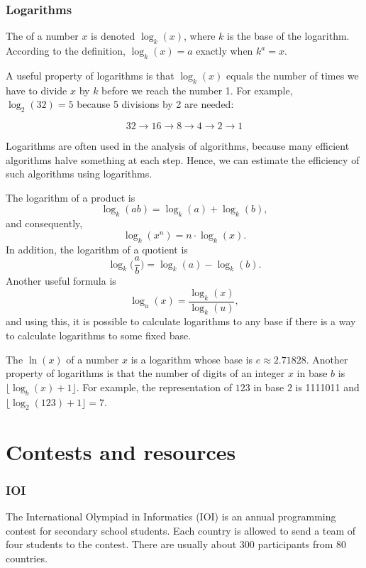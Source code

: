 \subsubsection{Logarithms}


The  of a number $x$
is denoted $\log_k(x)$, where $k$ is the base
of the logarithm.
According to the definition,
$\log_k(x)=a$ exactly when $k^a=x$.

A useful property of logarithms is
that $\log_k(x)$ equals the number of times
we have to divide $x$ by $k$ before we reach 
the number 1.
For example, $\log_2(32)=5$
because 5 divisions by 2 are needed:

\[32 \rightarrow 16 \rightarrow 8 \rightarrow 4 \rightarrow 2 \rightarrow 1 \]

Logarithms are often used in the analysis of
algorithms, because many efficient algorithms
halve something at each step.
Hence, we can estimate the efficiency of such algorithms
using logarithms.

The logarithm of a product is
\[\log_k(ab) = \log_k(a)+\log_k(b),\]
and consequently,
\[\log_k(x^n) = n \cdot \log_k(x).\]
In addition, the logarithm of a quotient is
\[\log_k\Big(\frac{a}{b}\Big) = \log_k(a)-\log_k(b).\]
Another useful formula is
\[\log_u(x) = \frac{\log_k(x)}{\log_k(u)},\]
and using this, it is possible to calculate
logarithms to any base if there is a way to
calculate logarithms to some fixed base.


The  $\ln(x)$ of a number $x$
is a logarithm whose base is $e \approx 2.71828$.
Another property of logarithms is that
the number of digits of an integer $x$ in base $b$ is
$\lfloor \log_b(x)+1 \rfloor$.
For example, the representation of
$123$ in base $2$ is 1111011 and
$\lfloor \log_2(123)+1 \rfloor = 7$.

\section{Contests and resources}

\subsubsection{IOI}

The International Olympiad in Informatics (IOI)
is an annual programming contest for
secondary school students.
Each country is allowed to send a team of
four students to the contest.
There are usually about 300 participants
from 80 countries.

